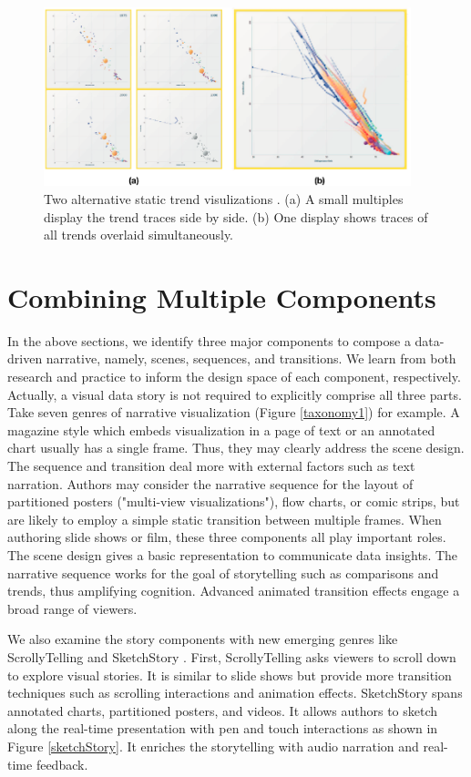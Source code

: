 \begin{figure}[htb]
	\centering 
	\includegraphics[width=0.95\textwidth]{figure/Trend.png} 
	\caption{ Two alternative static trend visulizations \cite{Robertson2008}. (a) A small multiples display the trend traces side by side. (b) One display shows traces of all trends overlaid simultaneously. } 
	\label{trend} 
\end{figure}


\section{Combining Multiple Components}

In the above sections, we identify three major components to compose a data-driven narrative, namely, scenes, sequences, and transitions. We learn from both research and practice to inform the design space of each component, respectively. Actually, a visual data story is not required to explicitly comprise all three parts. Take seven genres of narrative visualization (Figure \ref{taxonomy1}) for example. A magazine style which embeds visualization in a page of text or an annotated chart usually has a single frame. Thus, they may clearly address the scene design. The sequence and transition deal more with external factors such as text narration. Authors may consider the narrative sequence for the layout of partitioned posters ("multi-view visualizations"), flow charts, or comic strips, but are likely to employ a simple static transition between multiple frames. When authoring slide shows or film, these three components all play important roles. The scene design gives a basic representation to communicate data insights. The narrative sequence works for the goal of storytelling such as comparisons and trends, thus amplifying cognition. Advanced animated transition effects engage a broad range of viewers.

We also examine the story components with new emerging genres like ScrollyTelling \cite{scrollytelling} and SketchStory \cite{Lee2013}. First, ScrollyTelling asks viewers to scroll down to explore visual stories. It is similar to slide shows but provide more transition techniques such as scrolling interactions and animation effects. SketchStory spans annotated charts, partitioned posters, and videos. It allows authors to sketch along the real-time presentation with pen and touch interactions as shown in Figure \ref{sketchStory}. It enriches the storytelling with audio narration and real-time feedback.

